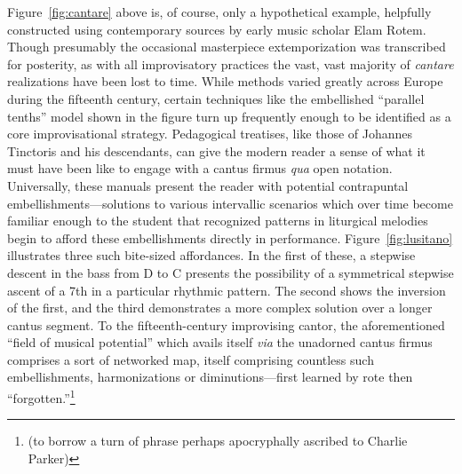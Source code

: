     Figure~\ref{fig:cantare} above is, of course, only a hypothetical example, helpfully constructed using contemporary sources by early music scholar Elam Rotem. Though presumably the occasional masterpiece extemporization was transcribed for posterity, as with all improvisatory practices the vast, vast majority of \textit{cantare} realizations have been lost to time. While methods varied greatly across Europe during the fifteenth century, certain techniques like the embellished ``parallel tenths'' model shown in the figure turn up frequently enough to be identified as a core improvisational strategy.\autocite{Rotem_2022} Pedagogical treatises, like those of Johannes Tinctoris and his descendants, can give the modern reader a sense of what it must have been like to engage with a cantus firmus \textit{qua} open notation. Universally, these manuals present the reader with potential contrapuntal embellishments---solutions to various intervallic scenarios which over time become familiar enough to the student that recognized patterns in liturgical melodies begin to afford these embellishments directly in performance. Figure~\ref{fig:lusitano} illustrates three such bite-sized affordances. In the first of these, a stepwise descent in the bass from D to C presents the possibility of a symmetrical stepwise ascent of a 7th in a particular rhythmic pattern. The second shows the inversion of the first, and the third demonstrates a more complex solution over a longer cantus segment. To the fifteenth-century improvising cantor, the aforementioned ``field of musical potential'' which avails itself \textit{via} the unadorned cantus firmus comprises a sort of networked map, itself comprising countless such embellishments, harmonizations or diminutions---first learned by rote then ``forgotten.''\footnote{(to borrow a turn of phrase perhaps apocryphally ascribed to Charlie Parker)}

